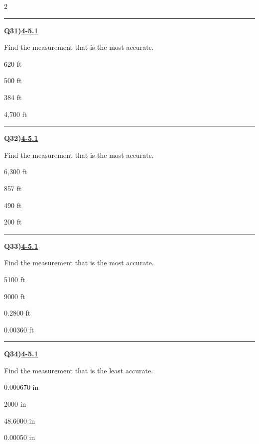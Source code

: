 \documentclass[11pt]{article}
\newenvironment{Qbox}[2]{%
  \par\medskip\noindent\begin{minipage}{\linewidth}%
  \hrule\medskip%
  \textbf{Q#1)}\hfill\textbf{\underline{#2}}\par\smallskip%
}{\par\end{minipage}\par\medskip}
\begin{document}
\begin{multicols}{2}
\begin{Qbox}{31}{4-5.1}
Find the measurement that is the most accurate.
\begin{choices}
  \item 620 ft
  \item 500 ft
  \item 384 ft
  \item 4,700 ft
\end{choices}
\end{Qbox}

\begin{Qbox}{32}{4-5.1}
Find the measurement that is the most accurate.
\begin{choices}
  \item 6,300 ft
  \item 857 ft
  \item 490 ft
  \item 200 ft
\end{choices}
\end{Qbox}

\begin{Qbox}{33}{4-5.1}
Find the measurement that is the most accurate.
\begin{choices}
  \item 5100 ft
  \item 9000 ft
  \item 0.2800 ft
  \item 0.00360 ft
\end{choices}
\end{Qbox}

\begin{Qbox}{34}{4-5.1}
Find the measurement that is the least accurate.
\begin{choices}
  \item 0.000670 in
  \item 2000 in
  \item 48.6000 in
  \item 0.00050 in
\end{choices}
\end{Qbox}


\end{multicols}
\end{document}
